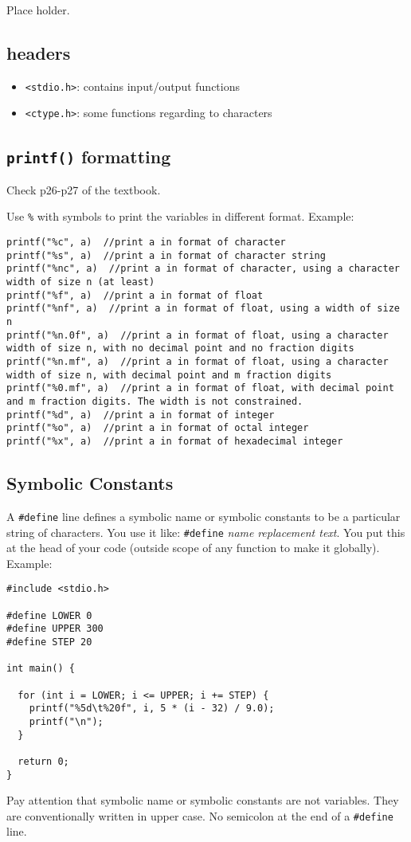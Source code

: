 \documentclass[12pt]{article}
\begin{document}
Place holder.

\subsection{headers}
\label{sec:orgbde2cf6}
\begin{itemize}
\item \texttt{<stdio.h>}: contains input/output functions
\item \texttt{<ctype.h>}: some functions regarding to characters
\end{itemize}

\subsection{\texttt{printf()} formatting}
\label{sec:org2da63da}
Check p26-p27 of the textbook.

Use \texttt{\%} with symbols to print the variables in different format.
Example:
\begin{verbatim}
printf("%c", a)  //print a in format of character
printf("%s", a)  //print a in format of character string
printf("%nc", a)  //print a in format of character, using a character width of size n (at least)
printf("%f", a)  //print a in format of float
printf("%nf", a)  //print a in format of float, using a width of size n
printf("%n.0f", a)  //print a in format of float, using a character width of size n, with no decimal point and no fraction digits
printf("%n.mf", a)  //print a in format of float, using a character width of size n, with decimal point and m fraction digits
printf("%0.mf", a)  //print a in format of float, with decimal point and m fraction digits. The width is not constrained.
printf("%d", a)  //print a in format of integer
printf("%o", a)  //print a in format of octal integer
printf("%x", a)  //print a in format of hexadecimal integer
\end{verbatim}
\subsection{Symbolic Constants}
\label{sec:org540df4e}
A \texttt{\#define} line defines a symbolic name or symbolic constants to be a particular string of characters. You use it like: \texttt{\#define} \emph{name} \emph{replacement text}. You put this at the head of your code (outside scope of any function to make it globally). Example:
\begin{verbatim}
#include <stdio.h>

#define LOWER 0
#define UPPER 300
#define STEP 20

int main() {

  for (int i = LOWER; i <= UPPER; i += STEP) {
    printf("%5d\t%20f", i, 5 * (i - 32) / 9.0);
    printf("\n");
  }

  return 0;
}
\end{verbatim}
Pay attention that symbolic name or symbolic constants are not variables. They are conventionally written in upper case. No semicolon at the end of a \texttt{\#define} line.
\end{document}
